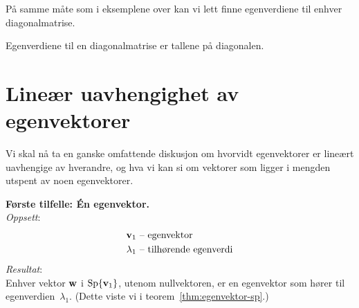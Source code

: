 På samme måte som i eksemplene over kan vi lett finne egenverdiene til
enhver diagonalmatrise.

\begin{thm}
Egenverdiene til en diagonalmatrise er tallene på diagonalen.
\end{thm}


\section*{Lineær uavhengighet av egenvektorer}

Vi skal nå ta en ganske omfattende diskusjon om hvorvidt egenvektorer
er lineært uavhengige av hverandre, og hva vi kan si om vektorer som
ligger i mengden utspent av noen egenvektorer. %

\medskip
\noindent\textbf{Første tilfelle: Én egenvektor.}
\\\textit{Oppsett}:
\begin{align*}
\mathbf{v}_1   \ &\text{-- egenvektor} \\
\lambda_1 \ &\text{-- tilhørende egenverdi}
\end{align*}
\textit{Resultat}:\\
Enhver vektor $\mathbf{w}$ i $\operatorname{Sp} \{\mathbf{v}_1\}$, utenom
nullvektoren, er en egenvektor som hører til egenverdien~$\lambda_1$.
(Dette viste vi i teorem~\ref{thm:egenvektor-sp}.)

